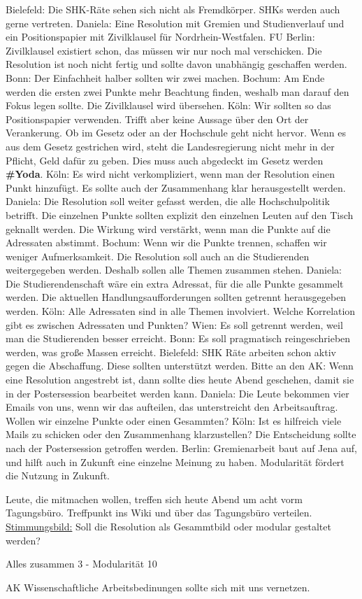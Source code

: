 \begin{outline}
          \2 Bielefeld: Die SHK-Räte sehen sich nicht als Fremdkörper. SHKs werden auch gerne vertreten.
        \1 Daniela: Eine Resolution mit Gremien und Studienverlauf und ein Positionspapier mit Zivilklausel für Nordrhein-Westfalen.
          \2 FU Berlin: Zivilklausel existiert schon, das müssen wir nur noch mal verschicken. Die Resolution ist noch nicht fertig und sollte davon unabhängig geschaffen werden.
          \2 Bonn: Der Einfachheit halber sollten wir zwei machen.
        \1 Bochum: Am Ende werden die ersten zwei Punkte mehr Beachtung finden, weshalb man darauf den Fokus legen sollte. Die Zivilklausel wird übersehen.
          \2 Köln: Wir sollten so das Positionspapier verwenden. Trifft aber keine Aussage über den Ort der Verankerung. Ob im Gesetz oder an der Hochschule geht nicht hervor. Wenn es aus dem Gesetz gestrichen wird, steht die Landesregierung nicht mehr in der Pflicht, Geld dafür zu geben. Dies muss auch abgedeckt im Gesetz werden \textbf{\#Yoda}.
          \2 Köln: Es wird nicht verkompliziert, wenn man der Resolution einen Punkt hinzufügt. Es sollte auch der Zusammenhang klar herausgestellt werden.
          \2 Daniela: Die Resolution soll weiter gefasst werden, die alle Hochschulpolitik betrifft.
          \2 Die einzelnen Punkte sollten explizit den einzelnen Leuten auf den Tisch geknallt werden.
          \2 Die Wirkung wird verstärkt, wenn man die Punkte auf die Adressaten abstimmt.
        \1 Bochum: Wenn wir die Punkte trennen, schaffen wir weniger Aufmerksamkeit. Die Resolution soll auch an die Studierenden weitergegeben werden. Deshalb sollen alle Themen zusammen stehen.
          \2 Daniela: Die Studierendenschaft wäre ein extra Adressat, für die alle Punkte gesammelt werden. Die aktuellen Handlungsaufforderungen sollten getrennt herausgegeben werden.
          \2 Köln: Alle Adressaten sind in alle Themen involviert. Welche Korrelation gibt es zwischen Adressaten und Punkten?
          \2 Wien: Es soll getrennt werden, weil man die Studierenden besser erreicht.
          \2 Bonn: Es soll pragmatisch reingeschrieben werden, was große Massen erreicht.
        \1 Bielefeld: SHK Räte arbeiten schon aktiv gegen die Abschaffung. Diese sollten unterstützt werden.
        \1 Bitte an den AK: Wenn eine Resolution angestrebt ist, dann sollte dies heute Abend geschehen, damit sie in der Postersession bearbeitet werden kann.
        \1 Daniela: Die Leute bekommen vier Emails von uns, wenn wir das aufteilen, das unterstreicht den Arbeitsauftrag. Wollen wir einzelne Punkte oder einen Gesammten?
        \2 Köln: Ist es hilfreich viele Mails zu schicken oder den Zusammenhang klarzustellen? Die Entscheidung sollte nach der Postersession getroffen werden.
        \2 Berlin: Gremienarbeit baut auf Jena auf, und hilft auch in Zukunft eine einzelne Meinung zu haben. Modularität fördert die Nutzung in Zukunft.
      \end{outline}
        Leute, die mitmachen wollen, treffen sich heute Abend um acht vorm Tagungsbüro. Treffpunkt ins Wiki und über das Tagungsbüro verteilen. \\
        \underline{Stimmungsbild:} Soll die Resolution als Gesammtbild oder modular gestaltet werden? \vspace{-5mm}

        \begin{center}
          Alles zusammen 3 - Modularität 10
        \end{center}

      AK Wissenschaftliche Arbeitsbedinungen sollte sich mit uns vernetzen.
